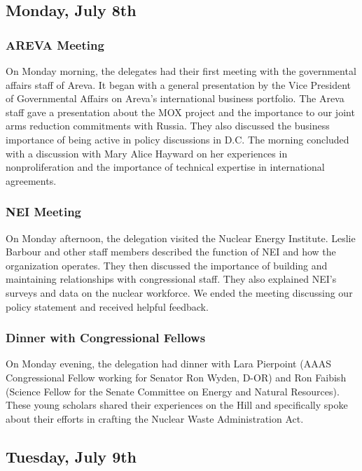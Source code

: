\subsection*{Monday, July 8th}

\subsubsection*{AREVA Meeting} 

On Monday morning, the delegates had their first meeting with the governmental
affairs staff of Areva. It began with a general presentation by the Vice
President of Governmental Affairs on Areva's international business
portfolio. The Areva staff gave a presentation about the MOX project and the
importance to our joint arms reduction commitments with Russia. They also
discussed the business importance of being active in policy discussions in
D.C. The morning concluded with a discussion with Mary Alice Hayward on her
experiences in nonproliferation and the importance of technical expertise in
international agreements.

\subsubsection*{NEI Meeting} 

On Monday afternoon, the delegation visited the Nuclear Energy Institute. Leslie
Barbour and other staff members described the function of NEI and how the
organization operates. They then discussed the importance of building and
maintaining relationships with congressional staff. They also explained NEI's
surveys and data on the nuclear workforce. We ended the meeting discussing our
policy statement and received helpful feedback.

\subsubsection*{Dinner with Congressional Fellows}

On Monday evening, the delegation had dinner with Lara Pierpoint (AAAS
Congressional Fellow working for Senator Ron Wyden, D-OR) and Ron Faibish
(Science Fellow for the Senate Committee on Energy and Natural Resources). These
young scholars shared their experiences on the Hill and specifically spoke about
their efforts in crafting the Nuclear Waste Administration Act.

\subsection*{Tuesday, July 9th}

